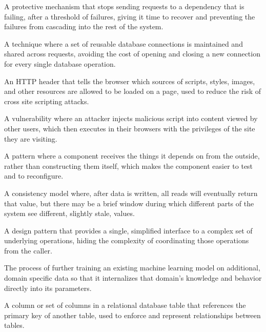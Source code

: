 \documentclass[11pt,a4paper]{report}
\begin{document}
\begin{description}[leftmargin=*,style=nextline]
\item[Circuit Breaker] A protective mechanism that stops sending requests to a dependency that is failing, after a threshold of failures, giving it time to recover and preventing the failures from cascading into the rest of the system.

\item[Connection Pooling] A technique where a set of reusable database connections is maintained and shared across requests, avoiding the cost of opening and closing a new connection for every single database operation.

\item[Content Security Policy (CSP)] An HTTP header that tells the browser which sources of scripts, styles, images, and other resources are allowed to be loaded on a page, used to reduce the risk of cross site scripting attacks.

\item[Cross Site Scripting (XSS)] A vulnerability where an attacker injects malicious script into content viewed by other users, which then executes in their browsers with the privileges of the site they are visiting.

\item[Dependency Injection] A pattern where a component receives the things it depends on from the outside, rather than constructing them itself, which makes the component easier to test and to reconfigure.

\item[Eventual Consistency] A consistency model where, after data is written, all reads will eventually return that value, but there may be a brief window during which different parts of the system see different, slightly stale, values.

\item[Facade Pattern] A design pattern that provides a single, simplified interface to a complex set of underlying operations, hiding the complexity of coordinating those operations from the caller.

\item[Fine Tuning] The process of further training an existing machine learning model on additional, domain specific data so that it internalizes that domain's knowledge and behavior directly into its parameters.

\item[Foreign Key] A column or set of columns in a relational database table that references the primary key of another table, used to enforce and represent relationships between tables.


\end{description}
\end{document}
